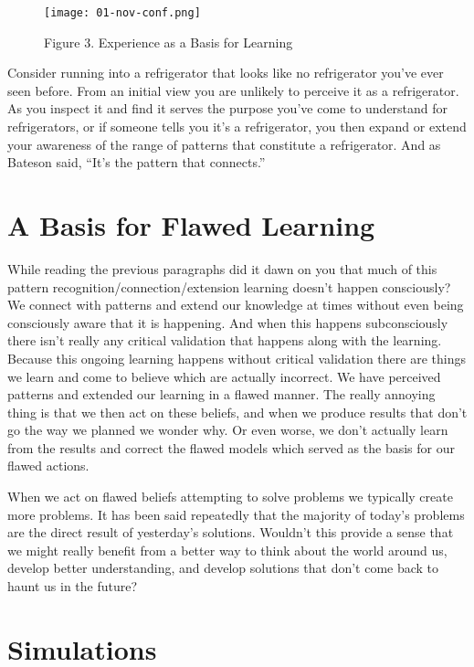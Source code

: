 \documentclass[]{memoir}
\let\Oldincludegraphics\includegraphics
\renewcommand{\includegraphics}[1]{\Oldincludegraphics[max size={\textwidth}{\textheight}]{#1}}
\begin{document}
\begin{figure}[htbp]
\centering
\texttt{[image: 01-nov-conf.png]}
\caption{Figure 3. Experience as a Basis for Learning}
\end{figure}

Consider running into a refrigerator that looks like no refrigerator
you've ever seen before. From an initial view you are unlikely to
perceive it as a refrigerator. As you inspect it and find it serves the
purpose you've come to understand for refrigerators, or if someone tells
you it's a refrigerator, you then expand or extend your awareness of the
range of patterns that constitute a refrigerator. And as Bateson said,
``It's the pattern that connects.''

\section{A Basis for Flawed Learning}

While reading the previous paragraphs did it dawn on you that much of
this pattern recognition/connection/extension learning doesn't happen
consciously? We connect with patterns and extend our knowledge at times
without even being consciously aware that it is happening. And when this
happens subconsciously there isn't really any critical validation that
happens along with the learning. Because this ongoing learning happens
without critical validation there are things we learn and come to
believe which are actually incorrect. We have perceived patterns and
extended our learning in a flawed manner. The really annoying thing is
that we then act on these beliefs, and when we produce results that
don't go the way we planned we wonder why. Or even worse, we don't
actually learn from the results and correct the flawed models which
served as the basis for our flawed actions.

When we act on flawed beliefs attempting to solve problems we typically
create more problems. It has been said repeatedly that the majority of
today's problems are the direct result of yesterday's solutions.
Wouldn't this provide a sense that we might really benefit from a better
way to think about the world around us, develop better understanding,
and develop solutions that don't come back to haunt us in the future?

\section{Simulations}
\end{document}
